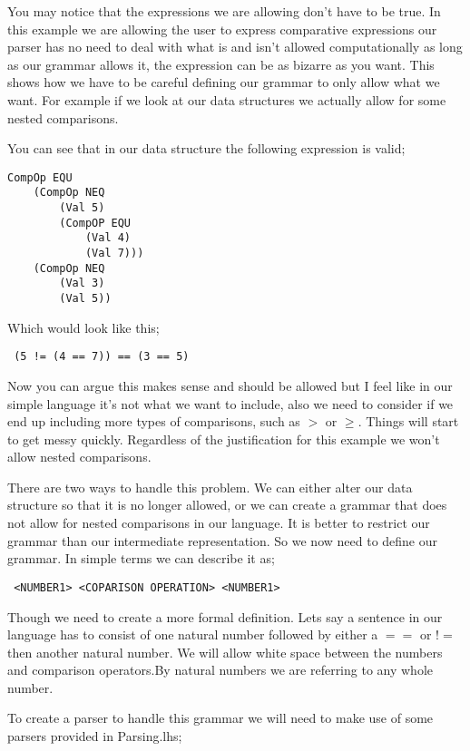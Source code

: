 You may notice that the expressions we are allowing don't have to be true. In this example we are allowing the user to express comparative expressions our parser has no need to deal with what is and isn't allowed computationally as long as our grammar allows it, the expression can be as bizarre as you want. This shows how we have to be careful defining our grammar to only allow what we want. For example if we look at our data structures we actually allow for some nested comparisons.

\newpage

You can see that in our data structure the following expression is valid;

\begin{lstlisting}
CompOp EQU 
	(CompOp NEQ 
		(Val 5) 
		(CompOP EQU 
			(Val 4)
			(Val 7))) 
	(CompOp NEQ 
		(Val 3) 
		(Val 5))
\end{lstlisting}

Which would look like this;

\begin{lstlisting}
 (5 != (4 == 7)) == (3 == 5)
\end{lstlisting}

Now you can argue this makes sense and should be allowed but I feel like in our simple language it's not what we want to include, also we need to consider if we end up including more types of comparisons, such as $>$ or $\geq$. Things will start to get messy quickly. Regardless of the justification for this example we won't allow nested comparisons. 

There are two ways to handle this problem. We can either alter our data structure so that it is no longer allowed, or we can create a grammar that does not allow for nested comparisons in our language. It is better to restrict our grammar than our intermediate representation. So we now need to define our grammar. In simple terms we can describe it as;

\begin{lstlisting}
 <NUMBER1> <COPARISON OPERATION> <NUMBER1>
\end{lstlisting}   	

Though we need to create a more formal definition. Lets say a sentence in our language has to consist of one natural number followed by either a $==$ or $!=$ then another natural number. We will allow white space between the numbers and comparison operators.By natural numbers we are referring to any whole number. 

To create a parser to handle this grammar we will need to make use of some parsers provided in Parsing.lhs;

